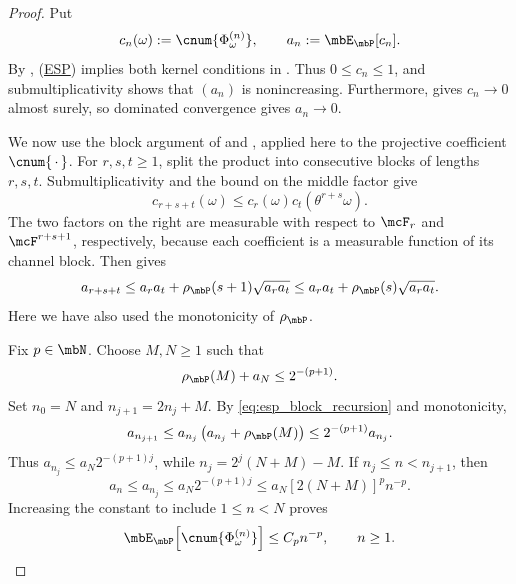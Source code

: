 \documentclass[a4paper]{article}
\numberwithin{equation}{section}   %
\theoremstyle{plain}   %
\theoremstyle{plain}   %
\theoremstyle{examplestyle}
\DeclareMathOperator{\pr}{\mbP}           %
\newcommand{\esp}{{\hyperlink{esp}{ESP}}}
\begin{document}
    \begin{proof}
        Put
        \[
            c_n(\omega):=\cnum{\Phi_\omega^{(n)}},
            \qquad a_n:=\mbE_{\pr}[c_n].
        \]
        By \cite[Lemma~2.1]{MS22}, (\esp) implies both kernel conditions in . 
        Thus \(0\le c_n\le1\), and submultiplicativity shows that \((a_n)\) is nonincreasing.
        Furthermore, \cite[Lemma~3.11]{MS22} gives \(c_n\to0\) almost surely, so dominated convergence gives \(a_n\to0\).
        
        We now use the block argument of
        \cite[Lemma~4.6]{MPS} and \cite[Lemma~4.5]{asym}, applied here to the projective coefficient \(\cnum{\,\cdot\,}\).
        For \(r,s,t\ge1\), split the product into consecutive blocks of lengths \(r,s,t\). 
        Submultiplicativity and the bound on the middle factor give
        \[
            c_{r+s+t}(\omega)
            \le c_r(\omega)c_t(\theta^{r+s}\omega).
        \]
        The two factors on the right are measurable with respect to \(\mcF_r\) and \(\mcF^{r+s+1}\), respectively, because each coefficient is a measurable function of its channel block. 
        Then  gives 
        \begin{equation}
        \label{eq:esp_block_recursion}
            a_{r+s+t} \le a_ra_t+\rho_{\pr}(s+1)\sqrt{a_ra_t}
            \le  a_ra_t+\rho_{\pr}(s)\sqrt{a_ra_t}. 
        \end{equation}
        Here we have also used the monotonicity of \(\rho_{\pr}\).
        
        Fix \(p\in\mbN\). Choose \(M,N\ge1\) such that
        \[
            \rho_{\pr}(M)+a_N\le2^{-(p+1)}.
        \]
        Set \(n_0=N\) and \(n_{j+1}=2n_j+M\). 
        By \eqref{eq:esp_block_recursion} and monotonicity,
        \[
            a_{n_{j+1}}
            \le a_{n_j}\left(a_{n_j}+\rho_{\pr}(M)\right)
            \le2^{-(p+1)}a_{n_j}.
        \]
        Thus \(a_{n_j}\le a_N2^{-(p+1)j}\), while \(n_j=2^j(N+M)-M\). If \(n_j\le n<n_{j+1}\), then
        \[
            a_n\le a_{n_j}
            \le a_N2^{-(p+1)j}
            \le a_N[2(N+M)]^p n^{-p}.
        \]
        Increasing the constant to include \(1\le n<N\) proves
        \begin{equation}
        \label{eq:cnum_decay_here}
            \mbE_{\pr}\!\left[\cnum{\Phi_\omega^{(n)}}\right]
            \le C_p n^{-p},
            \qquad n\ge1.
        \end{equation}
        

\end{proof}
\end{document}
